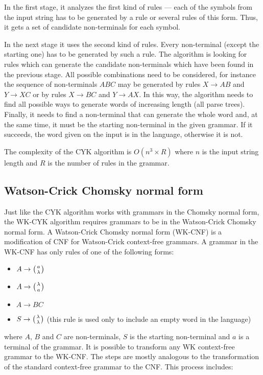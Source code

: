 In the first stage, it analyzes the first kind of rules --- each of the symbols from the input string has to be generated by a rule or several rules of this form. Thus, it gets a set of candidate non-terminals for each symbol.

In the next stage it uses the second kind of rules. Every non-terminal (except the starting one) has to be generated by such a rule.
The algorithm is looking for rules which can generate the candidate non-terminals which have been found in the previous stage. All possible combinations need to be considered, for instance the sequence of non-terminals $ABC$ may be generated by rules $X \rightarrow AB$ and $Y \rightarrow XC$ or by rules $X \rightarrow BC$ and $Y \rightarrow AX$. In this way, the algorithm needs to find all possible ways to generate words of increasing length (all parse trees). Finally, it needs to find a non-terminal that can generate the whole word and, at the same time, it must be the starting non-terminal in the given grammar. If it succeeds, the word given on the input is in the language, otherwise it is not.

The complexity of the CYK algorithm is $O(n^3 \times R)$ where $n$ is the input string length and $R$ is the number of rules in the grammar.

\subsection{Watson-Crick Chomsky normal form}
Just like the CYK algorithm works with grammars in the Chomsky normal form, the WK-CYK algorithm requires grammars to be in the Watson-Crick Chomsky normal form. A Watson-Crick Chomsky normal form (WK-CNF) is a modification of CNF for Watson-Crick context-free grammars. A grammar in the WK-CNF has only rules of one of the following forms:

\begin{itemize}
  \item{$A \rightarrow \wkpair{a}{\lambda}$}
  \item{$A \rightarrow \wkpair{\lambda}{a}$}
  \item{$A \rightarrow B C$}
  \item{$S \rightarrow \wkpair{\lambda}{\lambda}$ (this rule is used only to include an empty word in the language)}
\end{itemize}

where $A$, $B$ and $C$ are non-terminals, $S$ is the starting non-terminal and $a$ is a terminal of the grammar. It is possible to transform any WK context-free grammar to the WK-CNF. The steps are mostly analogous to the transformation of the standard context-free grammar to the CNF. This process includes:

